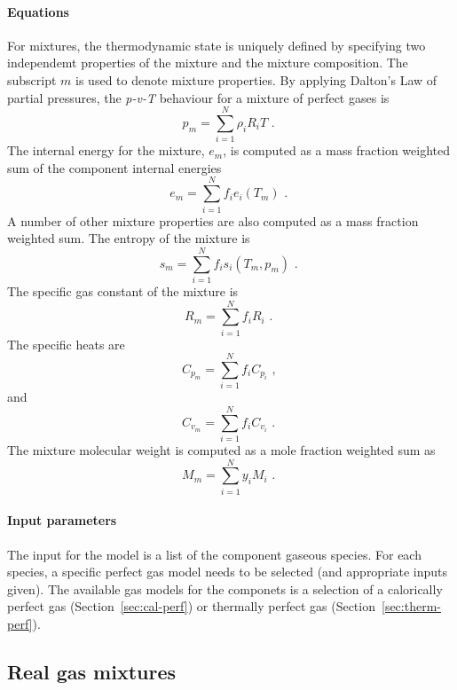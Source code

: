 \paragraph{Equations}
For mixtures, the thermodynamic state is uniquely defined
by specifying two independemt properties of the mixture and the mixture
composition.
The subscript $m$ is used to denote mixture properties.
By applying Dalton's Law of partial pressures, the
\textit{p-v-T} behaviour for a mixture of perfect
gases is
\begin{equation}
 p_m = \sum_{i=1}^N \rho_i R_i T \text{ . }
\end{equation}
The internal energy for the mixture, $e_m$, is computed as
a mass fraction weighted sum of the component
internal energies
\begin{equation}
 e_m = \sum_{i=1}^N f_i e_i(T_m) \text{ . }
\end{equation}
A number of other mixture properties are also computed
as a mass fraction weighted sum.
The entropy of the mixture is
\begin{equation}
 s_m = \sum_{i=1}^N f_i s_i(T_m, p_m) \text{ . }
\end{equation}
The specific gas constant of the mixture is
\begin{equation}
 R_m = \sum_{i=1}^N f_i R_i \text{ . }
\end{equation}
The specific heats are
\begin{equation}
  C_{p_m} = \sum_{i=1}^N f_i C_{p_i} \text{ , }
\end{equation}
and
\begin{equation}
  C_{v_m} = \sum_{i=1}^N f_i C_{v_i} \text{ . }
\end{equation}
The mixture molecular weight is computed as a mole fraction
weighted sum as
\begin{equation}
  M_m = \sum_{i=1}^N y_i M_i \text{ . }
\end{equation}

\paragraph{Input parameters}
The input for the model is a list of the component gaseous species.
For each species, a specific perfect gas model needs to be selected
(and appropriate inputs given).
The available gas models for the componets is a selection of a calorically perfect
gas (Section~\ref{sec:cal-perf}) or thermally perfect gas (Section~\ref{sec:therm-perf}).

\subsection{Real gas mixtures}
